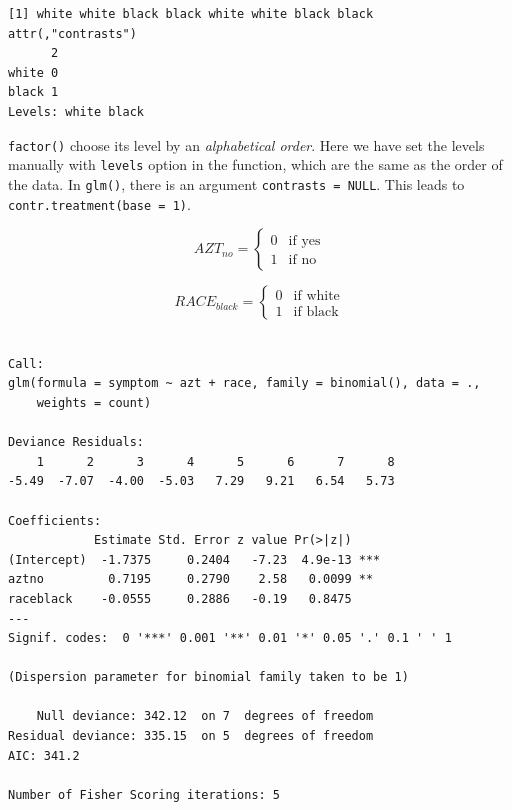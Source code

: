 \documentclass[]{book}
\newenvironment{Shaded}{\begin{snugshade}}{\end{snugshade}}
\newcommand{\DataTypeTok}[1]{\textcolor[rgb]{0.13,0.29,0.53}{#1}}
\newcommand{\KeywordTok}[1]{\textcolor[rgb]{0.13,0.29,0.53}{\textbf{#1}}}
\newcommand{\NormalTok}[1]{#1}
\newcommand{\OperatorTok}[1]{\textcolor[rgb]{0.81,0.36,0.00}{\textbf{#1}}}
\newcommand{\StringTok}[1]{\textcolor[rgb]{0.31,0.60,0.02}{#1}}
\begin{document}
\begin{verbatim}
[1] white white black black white white black black
attr(,"contrasts")
      2
white 0
black 1
Levels: white black
\end{verbatim}

\texttt{factor()} choose its level by an \emph{alphabetical order}. Here we have set the levels manually with \texttt{levels} option in the function, which are the same as the order of the data. In \texttt{glm()}, there is an argument \texttt{contrasts\ =\ NULL}. This leads to \texttt{contr.treatment(base\ =\ 1)}.

\[AZT_{no} = \begin{cases} 0 & \text{if yes} \\ 1 & \text{if no} \end{cases}\]

\[RACE_{black} = \begin{cases} 0 & \text{if white} \\ 1 & \text{if black} \end{cases}\]

\begin{Shaded}
\end{Shaded}

\begin{verbatim}

Call:
glm(formula = symptom ~ azt + race, family = binomial(), data = ., 
    weights = count)

Deviance Residuals: 
    1      2      3      4      5      6      7      8  
-5.49  -7.07  -4.00  -5.03   7.29   9.21   6.54   5.73  

Coefficients:
            Estimate Std. Error z value Pr(>|z|)    
(Intercept)  -1.7375     0.2404   -7.23  4.9e-13 ***
aztno         0.7195     0.2790    2.58   0.0099 ** 
raceblack    -0.0555     0.2886   -0.19   0.8475    
---
Signif. codes:  0 '***' 0.001 '**' 0.01 '*' 0.05 '.' 0.1 ' ' 1

(Dispersion parameter for binomial family taken to be 1)

    Null deviance: 342.12  on 7  degrees of freedom
Residual deviance: 335.15  on 5  degrees of freedom
AIC: 341.2

Number of Fisher Scoring iterations: 5
\end{verbatim}
\end{document}
